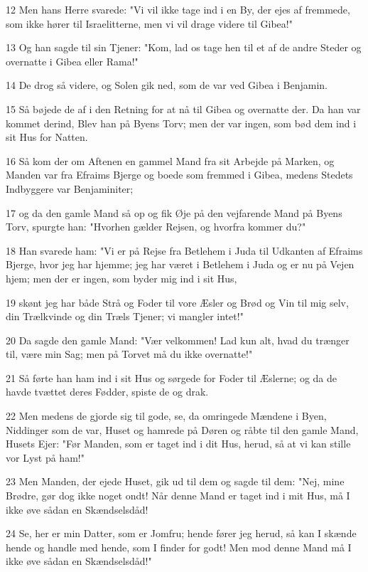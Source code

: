 \par 12 Men hans Herre svarede: "Vi vil ikke tage ind i en By, der ejes af fremmede, som ikke hører til Israelitterne, men vi vil drage videre til Gibea!"
\par 13 Og han sagde til sin Tjener: "Kom, lad os tage hen til et af de andre Steder og overnatte i Gibea eller Rama!"
\par 14 De drog så videre, og Solen gik ned, som de var ved Gibea i Benjamin.
\par 15 Så bøjede de af i den Retning for at nå til Gibea og overnatte der. Da han var kommet derind, Blev han på Byens Torv; men der var ingen, som bød dem ind i sit Hus for Natten.
\par 16 Så kom der om Aftenen en gammel Mand fra sit Arbejde på Marken, og Manden var fra Efraims Bjerge og boede som fremmed i Gibea, medens Stedets Indbyggere var Benjaminiter;
\par 17 og da den gamle Mand så op og fik Øje på den vejfarende Mand på Byens Torv, spurgte han: "Hvorhen gælder Rejsen, og hvorfra kommer du?"
\par 18 Han svarede ham: "Vi er på Rejse fra Betlehem i Juda til Udkanten af Efraims Bjerge, hvor jeg har hjemme; jeg har været i Betlehem i Juda og er nu på Vejen hjem; men der er ingen, som byder mig ind i sit Hus,
\par 19 skønt jeg har både Strå og Foder til vore Æsler og Brød og Vin til mig selv, din Trælkvinde og din Træls Tjener; vi mangler intet!"
\par 20 Da sagde den gamle Mand: "Vær velkommen! Lad kun alt, hvad du trænger til, være min Sag; men på Torvet må du ikke overnatte!"
\par 21 Så førte han ham ind i sit Hus og sørgede for Foder til Æslerne; og da de havde tvættet deres Fødder, spiste de og drak.
\par 22 Men medens de gjorde sig til gode, se, da omringede Mændene i Byen, Niddinger som de var, Huset og hamrede på Døren og råbte til den gamle Mand, Husets Ejer: "Før Manden, som er taget ind i dit Hus, herud, så at vi kan stille vor Lyst på ham!"
\par 23 Men Manden, der ejede Huset, gik ud til dem og sagde til dem: "Nej, mine Brødre, gør dog ikke noget ondt! Når denne Mand er taget ind i mit Hus, må I ikke øve sådan en Skændselsdåd!
\par 24 Se, her er min Datter, som er Jomfru; hende fører jeg herud, så kan I skænde hende og handle med hende, som I finder for godt! Men mod denne Mand må I ikke øve sådan en Skændselsdåd!"
